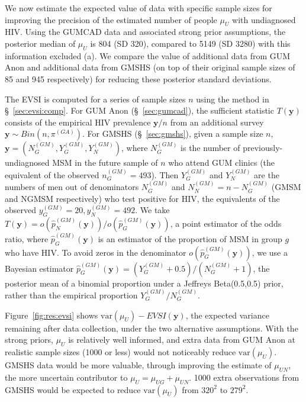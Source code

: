 \documentclass[12pt]{article}\usepackage[]{graphicx}\usepackage[]{color}
\newcommand{\var}{\mbox{var}}
\newcommand{\y}{\mathbf{y}}
\begin{document}
We now estimate the expected value of data with specific sample sizes for improving the precision of the estimated number of people $\mu_U$ with undiagnosed HIV.  Using the GUMCAD data and associated strong prior assumptions, the posterior median of $\mu_U$ is 804 (SD 320), compared to 5149 (SD 3280) with this information excluded (a).   We compare the value of additional data from GUM Anon and additional data from GMSHS (on top of their original sample sizes of 85 and 945 respectively) for reducing these posterior standard deviations. 

The EVSI is computed for a series of sample sizes $n$ using the method in \S~\ref{sec:evsi:comp}.  For GUM Anon (\S~\ref{sec:gumcad}), the sufficient statistic $T(\y)$ consists of the empirical HIV prevalence $\y/n$ from an additional survey $\y \sim Bin(n, \pi^{(GA)})$.  For GMSHS (\S~\ref{sec:gmshs}), given a sample size $n$, $\y = (N^{(GM)}_G,Y^{(GM)}_G,Y^{(GM)}_N)$, where $N^{(GM)}_G$ is the number of previously-undiagnosed MSM in the future sample of $n$ who attend GUM clinics (the equivalent of the observed $n^{(GM)}_G=493$).  Then $Y^{(GM)}_G$ and $Y^{(GM)}_N$ are the numbers of men out of denominators $N^{(GM)}_G$ and $N^{(GM)}_N=n-N^{(GM)}_G$ (GMSM and NGMSM respectively) who test positive for HIV, the equivalents of the observed $y^{(GM)}_G=20,y^{(GM)}_N=492$. We take $T(\y) = o(\hat p^{(GM)}_N(\y)) / o(\hat p^{(GM)}_G(\y))$, a point estimator of the odds ratio, where $\hat p^{(GM)}_G(\y)$ is an estimator of the proportion of MSM in group $g$ who have HIV.  To avoid zeros in the denominator $o(\hat p^{(GM)}_G(\y))$, we use a Bayesian estimator $\hat p^{(GM)}_G(\y) = (Y^{(GM)}_G+0.5)/(N^{(GM)}_G+1)$, the posterior mean of a binomial proportion under a Jeffreys Beta(0.5,0.5) prior, rather than the empirical proportion $Y^{(GM)}_G/N^{(GM)}_G$.

Figure~\ref{fig:res:evsi} shows $\var(\mu_U) - EVSI(\y)$, the expected variance remaining after data collection, under the two alternative assumptions.     With the strong priors, $\mu_U$ is relatively well informed, and extra data from GUM Anon at realistic sample sizes (1000 or less) would not noticeably reduce $\var(\mu_U)$.   GMSHS data would be more valuable, through improving the estimate of $\mu_{UN}$, the more uncertain contributor to $\mu_U = \mu_{UG} + \mu_{UN}$.   1000 extra observations from GMSHS would be expected to reduce $\var(\mu_U)$ from $320^2$ to $279^2$.
\end{document}
